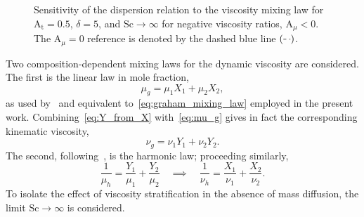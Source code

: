 \documentclass[11pt]{article}
\DeclareRobustCommand{\dashlegend}{%
    \tikz[baseline=-0.6ex]\draw[line width=0.5pt,dashed] (0,0) -- (0.25,0);%
}
\newcommand{\Atw}{\mathrm{A_t}}
\newcommand{\Sch}{\mathrm{Sc}}
\newcommand{\Amu}{\mathrm{A}_{\mu}}
\newenvironment{appen}{\appendix}{}
\newif\ifloadfig
\newcommand{\figfile}[1]{\ifloadfig\fi}
\begin{document}
\begin{appen}
\begin{figure}
\begin{minipage}[t]{0.32\textwidth}
        \centering
        \figfile{figures/verification_figures/V06_visc_law_Amu-0.90.tex}
    \end{minipage}
    \begin{minipage}[t]{0.32\textwidth}
        \centering
        \figfile{figures/verification_figures/V06_visc_law_Amu-0.50.tex}
    \end{minipage}
    \begin{minipage}[t]{0.32\textwidth}
        \centering
        \figfile{figures/verification_figures/V06_visc_law_Amu-0.05.tex}
    \end{minipage}
    \caption{Sensitivity of the dispersion relation to the viscosity mixing law for \(\Atw = 0.5\), \(\delta = 5\), and \(\Sch \to \infty\) for negative viscosity ratios, \(\Amu < 0\). The \(\Amu = 0\) reference is denoted by the dashed blue line \((\dashlegend)\).}
    \label{fig:visc_law_comparison_neg}
\end{figure}
Two composition-dependent mixing laws for the dynamic viscosity are considered. The first is the linear law in mole fraction,
\begin{equation}
    \label{eq:mu_g}
    \mu_g = \mu_1 X_1 + \mu_2 X_2,
\end{equation}
as used by~\citet{morgan-likhachev-jacobs-2016} and equivalent to~\eqref{eq:graham_mixing_law} employed in the present work. Combining~\eqref{eq:Y_from_X} with~\eqref{eq:mu_g} gives in fact the corresponding kinematic viscosity,
\begin{equation}
    \label{eq:nu_g}
    \nu_g = \nu_1 Y_1 + \nu_2 Y_2.
\end{equation}
The second, following~\citet{baltzer-livescu-2020}, is the harmonic law; proceeding similarly,
\begin{equation}
    \label{eq:nu_h}
    \frac{1}{\mu_h} = \frac{Y_1}{\mu_1} + \frac{Y_2}{\mu_2}
    \quad\implies\quad
    \frac{1}{\nu_h} = \frac{X_1}{\nu_1} + \frac{X_2}{\nu_2}.
\end{equation}
To isolate the effect of viscosity stratification in the absence of mass diffusion, the limit \(\Sch \to \infty\) is considered.
\begin{figure}
    \centering
    \begin{minipage}[t]{0.32\textwidth}
        \centering
        \figfile{figures/verification_figures/V06_visc_law_Amu+0.05.tex}
    \end{minipage}
    \begin{minipage}[t]{0.32\textwidth}
        \centering
        \figfile{figures/verification_figures/V06_visc_law_Amu+0.50.tex}

\end{minipage}
\end{figure}
\end{appen}
\end{document}
